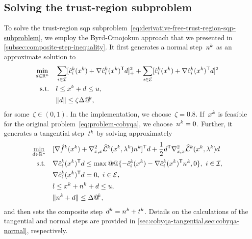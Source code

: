 \subsection{Solving the trust-region  subproblem}
\label{subsec:solving-trust-region-subproblem}

To solve the trust-region \gls{sqp} subproblem~\cref{eq:derivative-free-trust-region-sqp-subproblem}, we employ the Byrd-Omojokun approach that we presented in \cref{subsec:composite-step-inequality}.
It first generates a normal step~$\nstep[k]$ as an approximate solution to
\begin{subequations}
    \label{eq:cobyqa-normal}
    \begin{align}
        \min_{\step \in \R^n}   & \quad \sum_{i \in \iub} \posp{\conm[k]{i}(\iter[k]) + \nabla \conm[k]{i}(\iter[k])^{\T} \step}^2 + \sum_{i \in \ieq} [\conm[k]{i}(\iter[k]) + \nabla \conm[k]{i}(\iter[k])^{\T} \step]^2 \label{eq:cobyqa-normal-obj}\\
        \text{s.t.}             & \quad \xl \le \iter[k] + \step \le \xu,\\
                                & \quad \norm{\step} \le \zeta \rad[k], \label{eq:cobyqa-normal-tr}
    \end{align}
\end{subequations}
for some~$\zeta \in (0, 1)$.
In the implementation, we choose~$\zeta = 0.8$.
If~$\iter[k]$ is feasible for the original problem~\cref{eq:problem-cobyqa}, we choose~$\nstep[k] = 0$.
Further, it generates a tangential step~$\tstep[k]$ by solving approximately
\begin{subequations}
    \label{eq:cobyqa-tangential-original}
    \begin{align}
        \min_{\step \in \R^n}   & \quad [\nabla \objm[k](\iter[k]) + \nabla_{x, x}^2 \lagm[k](\iter[k], \lm[k]) \nstep[k]]^{\T} \step + \frac{1}{2} \step^{\T} \nabla_{x, x}^2 \lagm[k](\iter[k], \lm[k]) \step\\
        \text{s.t.}             & \quad \nabla \conm[k]{i}(\iter[k])^{\T} \step \le \max @@ \set{-\conm[k]{i}(\iter[k]) - \nabla \conm[k]{i}(\iter[k])^{\T} \nstep[k], 0}, ~ i \in \iub, \label{eq:cobyqa-tangential-original-ub}\\
                                & \quad \nabla \conm[k]{i}(\iter[k])^{\T} \step = 0, ~ i \in \ieq,\\
                                & \quad \xl \le \iter[k] + \nstep[k] + \step \le \xu,\\
                                & \quad \norm{\nstep[k] + \step} \le \rad[k],
    \end{align}
\end{subequations}
and then sets the composite step~$\step[k] = \nstep[k] + \tstep[k]$.
Details on the calculations of the tangential and normal steps are provided in \cref{sec:cobyqa-tangential,sec:cobyqa-normal}, respectively.

